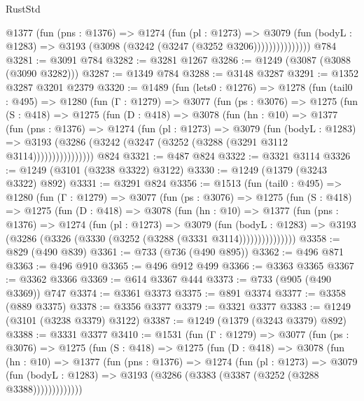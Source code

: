 \begin{lexlean}{RustStd}
\begin{coremodule}
                  @1377
                    (fun (pns : @1376) =>
                    @1274
                      (fun (pl : @1273) =>
                      @3079
                        (fun (bodyL : @1283) =>
                        @3193 (@3098 (@3242 (@3247 (@3252 @3206)))))))))))))))
    @784
@3281 := @3091 @784
@3282 := @3281 @1267
@3286 := @1249 (@3087 (@3088 (@3090 @3282)))
@3287 := @1349 @784
@3288 := @3148 @3287
@3291 := @1352 @3287 @3201 @2379
@3320 := @1489
    (fun (lets0 : @1276) =>
    @1278
      (fun (tail0 : @495) =>
      @1280
        (fun (Γ : @1279) =>
        @3077
          (fun (ps : @3076) =>
          @1275
            (fun (S : @418) =>
            @1275
              (fun (D : @418) =>
              @3078
                (fun (hn : @10) =>
                @1377
                  (fun (pns : @1376) =>
                  @1274
                    (fun (pl : @1273) =>
                    @3079
                      (fun (bodyL : @1283) =>
                      @3193 (@3286 (@3242 (@3247 (@3252 (@3288 (@3291 @3112 @3114))))))))))))))))
    @824
@3321 := @487 @824
@3322 := @3321 @3114
@3326 := @1249 (@3101 (@3238 @3322) @3122)
@3330 := @1249 (@1379 (@3243 @3322) @892)
@3331 := @3291 @824
@3356 := @1513
    (fun (tail0 : @495) =>
    @1280
      (fun (Γ : @1279) =>
      @3077
        (fun (ps : @3076) =>
        @1275
          (fun (S : @418) =>
          @1275
            (fun (D : @418) =>
            @3078
              (fun (hn : @10) =>
              @1377
                (fun (pns : @1376) =>
                @1274
                  (fun (pl : @1273) =>
                  @3079
                    (fun (bodyL : @1283) =>
                    @3193 (@3286 (@3326 (@3330 (@3252 (@3288 (@3331 @3114)))))))))))))))
@3358 := @829 (@490 @839)
@3361 := @733 (@736 (@490 @895))
@3362 := @496 @871
@3363 := @496 @910
@3365 := @496 @912 @499
@3366 := @3363 @3365
@3367 := @3362 @3366
@3369 := @614 @3367 @444
@3373 := @733 (@905 (@490 @3369)) @747
@3374 := @3361 @3373
@3375 := @891 @3374
@3377 := @3358 (@889 @3375)
@3378 := @3356 @3377
@3379 := @3321 @3377
@3383 := @1249 (@3101 (@3238 @3379) @3122)
@3387 := @1249 (@1379 (@3243 @3379) @892)
@3388 := @3331 @3377
@3410 := @1531
    (fun (Γ : @1279) =>
    @3077
      (fun (ps : @3076) =>
      @1275
        (fun (S : @418) =>
        @1275
          (fun (D : @418) =>
          @3078
            (fun (hn : @10) =>
            @1377
              (fun (pns : @1376) =>
              @1274
                (fun (pl : @1273) =>
                @3079
                  (fun (bodyL : @1283) =>
                  @3193 (@3286 (@3383 (@3387 (@3252 (@3288 @3388)))))))))))))

\end{coremodule}
\end{lexlean}
